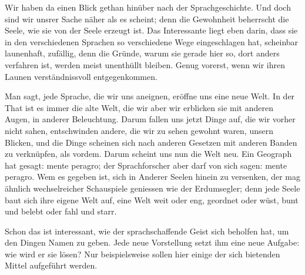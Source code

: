 Wir haben da einen Blick gethan hinüber nach der Sprachgeschichte. Und doch sind wir unsrer Sache näher als es scheint; denn die Gewohn\-\label{fp.40}heit beherrscht die Seele, wie sie von der Seele erzeugt ist. Das Interessante liegt eben darin, dass sie in den verschiedenen Sprachen so verschiedene Wege eingeschlagen hat, scheinbar launenhaft, zufällig, denn die Gründe, warum sie gerade hier so, dort anders verfahren ist, werden meist unenthüllt bleiben. Genug vorerst, wenn wir ihren Launen verständnissvoll entgegenkommen.

Man sagt, jede Sprache, die wir uns aneignen, eröffne uns eine neue Welt. In der That ist es immer die alte Welt, die wir  aber wir erblicken sie mit anderen Augen, in anderer Beleuchtung. Darum fallen uns jetzt Dinge auf, die wir vorher nicht sahen, entschwinden andere, die wir zu sehen gewohnt waren, unsern Blicken, und die Dinge scheinen sich nach anderen Gesetzen mit anderen Banden zu verknüpfen, als vordem. Darum scheint uns nun die Welt neu. Ein Geograph hat gesagt:  mente peragro; der Sprachforscher aber darf von sich sagen:  mente peragro. Wem es gegeben ist, sich in Anderer Seelen hinein zu versenken, der mag ähnlich wechselreicher Schauspiele geniessen wie der Erdumsegler; denn jede Seele baut sich ihre eigene Welt auf, eine Welt weit oder eng, geordnet oder wüst, bunt und belebt oder fahl und starr.

Schon das ist interessant, wie der sprachschaffende Geist sich beholfen hat, um den Dingen Namen zu geben. Jede neue Vorstellung setzt ihm eine neue Aufgabe: wie wird er sie lösen? Nur beispielsweise sollen hier einige der sich bietenden Mittel aufgeführt werden.

